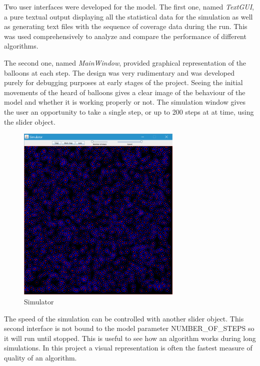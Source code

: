 Two user interfaces were developed for the model. The first one, named \textit{TextGUI}, a pure textual output displaying all the statistical data for the simulation as well as generating text files with the sequence of coverage data during the run. This was used comprehensively to analyze and compare the performance of different algorithms. 

The second one, named \textit{MainWindow}, provided graphical representation of the balloons at each step. The design was very rudimentary and was developed purely for debugging purposes at early stages of the project. Seeing the initial movements of the heard of balloons gives a clear image of the behaviour of the model and whether it is working properly or not. The simulation window gives the user an opportunity to take a single step, or up to 200 steps at at time, using the slider object.


\begin{figure}[H]
    \centering
    \includegraphics[width=0.7\textwidth]{graphics/MainWindow.png}
\caption{Simulator}
\label{fig:mainwindow}
\end{figure}

The speed of the simulation can be controlled with another slider object. This second interface is not bound to the model parameter NUMBER\_OF\_STEPS so it will run until stopped. This is useful to see how an algorithm works during long simulations. In this project a visual representation is often the fastest measure of quality of an algorithm. 